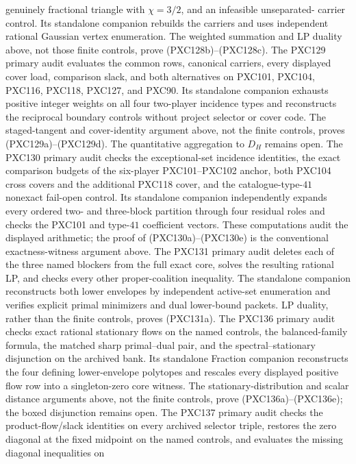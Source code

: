 \documentclass[11pt]{article}
\begin{document}
genuinely fractional triangle with $\chi=3/2$, and an infeasible unseparated-
carrier control.  Its standalone companion rebuilds the carriers and uses
independent rational Gaussian vertex enumeration.  The weighted summation
and LP duality above, not those finite controls, prove (PXC128b)--(PXC128c).
The PXC129 primary audit evaluates the common rows, canonical carriers,
every displayed cover load, comparison slack, and both alternatives on
PXC101, PXC104, PXC116, PXC118, PXC127, and PXC90.  Its standalone companion
exhausts positive integer weights on all four two-player incidence types and
reconstructs the reciprocal boundary controls without project selector or
cover code.  The staged-tangent and cover-identity argument above, not the
finite controls, proves (PXC129a)--(PXC129d).  The quantitative aggregation
to $D_H$ remains open.
The PXC130 primary audit checks the exceptional-set incidence identities,
the exact comparison budgets of the six-player PXC101--PXC102 anchor, both
PXC104 cross covers and the
additional PXC118 cover, and the catalogue-type-$41$ nonexact fail-open
control.  Its standalone companion independently expands every ordered
two- and three-block partition through four residual roles and checks the
PXC101 and type-$41$ coefficient vectors.  These computations audit the
displayed arithmetic; the proof of (PXC130a)--(PXC130e) is the conventional
exactness-witness argument above.
The PXC131 primary audit deletes each of the three named blockers from the
full exact core, solves the resulting rational LP, and checks every other
proper-coalition inequality.  The standalone companion reconstructs both
lower envelopes by independent active-set enumeration and verifies explicit
primal minimizers and dual lower-bound packets.  LP duality, rather than the
finite controls, proves (PXC131a).
The PXC136 primary audit checks exact rational stationary flows on the named
controls, the balanced-family formula, the matched sharp primal--dual pair,
and the spectral--stationary disjunction on the archived bank.  Its
standalone Fraction companion reconstructs the four defining lower-envelope
polytopes and rescales every displayed positive flow row into a
singleton-zero core witness.  The stationary-distribution and scalar
distance arguments above, not the finite controls, prove
(PXC136a)--(PXC136e); the boxed disjunction remains open.
The PXC137 primary audit checks the product-flow/slack identities on every
archived selector triple, restores the zero diagonal at the fixed midpoint
on the named controls, and evaluates the missing diagonal inequalities on
\end{document}
